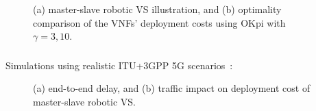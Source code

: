 \documentclass[aspectratio=169]{beamer}
\begin{document}
\begin{frame}
\begin{figure}[ht]
        \caption{(a) master-slave robotic VS illustration, and (b) optimality comparison of the VNFs' deployment costs using OKpi with $\gamma=3,10$.}
        \label{fig:fig}
    \end{figure}
\end{frame}


\begin{frame}
    \frametitle{\secname}
    \framesubtitle{\subsecname}

    Simulations using realistic ITU+3GPP 5G scenarios~\cite{modelling-bs}:
    \begin{figure}[ht]
        \hspace{2em}
        \caption{(a) end-to-end delay, and (b) traffic impact on deployment cost of master-slave robotic VS.}
        \label{fig:increase-results}
    \end{figure}
\end{frame}
\end{document}
